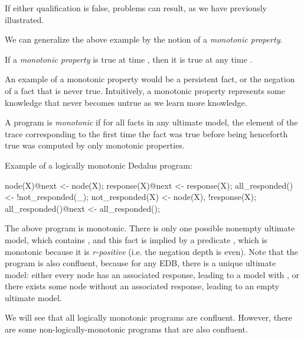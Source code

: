If either qualification is false, problems can result, as we have previously illustrated.


We can generalize the above example by the notion of a {\em monotonic property}.

\begin{definition}
If a {\em monotonic property} is true at time , then it is true at any time .
\end{definition}

An example of a monotonic property would be a persistent fact, or the negation of a fact that is never true.  Intuitively, a monotonic property represents some knowledge that never becomes untrue as we learn more knowledge.

\begin{definition}
A \lang program is {\em monotonic} if for all facts in any ultimate model, the element of the trace corresponding to the first time the fact was true before being henceforth true was computed by only monotonic properties. 
\end{definition}

\begin{example}
Example of a logically monotonic Dedalus program:\\
\begin{Dedalus}
node(X)@next <- node(X);
response(X)@next <- response(X);
all_responded() <- !not_responded(_);
not_responded(X) <- node(X), !response(X);
all_responded()@next <- all_responded();
\end{Dedalus}
\end{example}

The above program is monotonic. There is only one possible nonempty ultimate model, which contains , and this fact is implied by a predicate , which is monotonic because it is {\em r-positive}  (i.e. the negation depth is even).  Note that the program is also confluent, because for any EDB, there is a unique ultimate model: either every node has an associated response, leading to a model with , or there exists some node without an associated response, leading to an empty ultimate model.

We will see that all logically monotonic programs are confluent.  However, there are some non-logically-monotonic programs that are also confluent.

